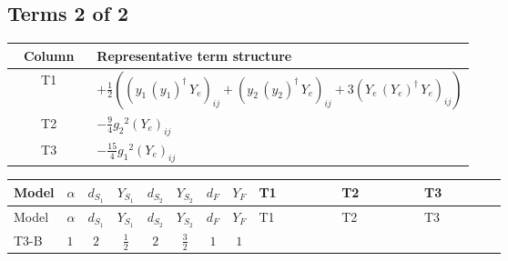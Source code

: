 \documentclass[8pt]{article}
\begin{document}
\begin{landscape}
\subsection*{Terms 2 of 2}
\begin{center}
\begin{tabular}{@{}c >{\raggedright\arraybackslash}p{0.82\linewidth}@{}}
\toprule
Column & Representative term structure \\
\midrule
T1 & \(\displaystyle +\frac{1}{2} (\left({y_1}\,\left({y_1}\right)^{\dagger}\,{Y_e}\right)_{ij}+\left({y_2}\,\left({y_2}\right)^{\dagger}\,{Y_e}\right)_{ij}+3 \left({Y_e}\,\left({Y_e}\right)^{\dagger}\,{Y_e}\right)_{ij})\) \\
\midrule
T2 & \(\displaystyle -\frac{9}{4} {g_2}^2 \left({Y_e}\right)_{ij}\) \\
\midrule
T3 & \(\displaystyle -\frac{15}{4} {g_1}^2 \left({Y_e}\right)_{ij}\) \\
\midrule
\bottomrule
\end{tabular}
\end{center}
\smallskip
\tiny
\begin{longtable}{@{}llcccccc >{\raggedright\arraybackslash}p{0.21\linewidth} >{\raggedright\arraybackslash}p{0.21\linewidth} >{\raggedright\arraybackslash}p{0.21\linewidth}@{}}
\toprule
Model & $\alpha$ & $d_{S_1}$ & $Y_{S_1}$ & $d_{S_2}$ & $Y_{S_2}$ & $d_F$ & $Y_F$ & T1 & T2 & T3 \\
\midrule
\endfirsthead
\toprule
Model & $\alpha$ & $d_{S_1}$ & $Y_{S_1}$ & $d_{S_2}$ & $Y_{S_2}$ & $d_F$ & $Y_F$ & T1 & T2 & T3 \\
\midrule
\endhead
T3-B & $1$ & $2$ & $\frac{1}{2}$ & $2$ & $\frac{3}{2}$ & $1$ & $1$ & \scriptsize\adjustbox{max width=\linewidth}{$\begin{gathered} +\frac{1}{2} (\left({y_1}\,\left({y_1}\right)^{\dagger}\,{Y_e}\right)_{ij}+\left({y_2}\,\left({y_2}\right)^{\dagger}\,{Y_e}\right)_{ij}+3 \left({Y_e}\,\left({Y_e}\right)^{\dagger}\,{Y_e}\right)_{ij})\end{gathered}$} & \scriptsize\adjustbox{max width=\linewidth}{$\begin{gathered} -\frac{9}{4} {g_2}^2 \left({Y_e}\right)_{ij}\end{gathered}$} & \scriptsize\adjustbox{max width=\linewidth}{$\begin{gathered} -\frac{15}{4} {g_1}^2 \left({Y_e}\right)_{ij}\end{gathered}$} \\
\midrule
\bottomrule
\end{longtable}
\clearpage

\end{landscape}
\end{document}
